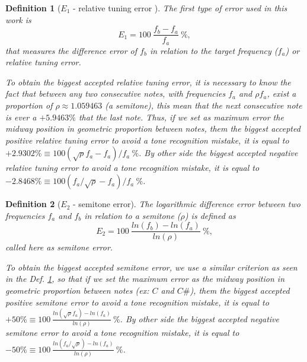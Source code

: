 \documentclass[11pt,twocolumn]{article}
\newtheorem{mydef}{Definition}[section]
\begin{document}
\begin{mydef}[$E_1$ - relative tuning error ]
\label{def:max:E1}
The first type of error used in this work is 
\begin{equation}
E_1=100~\frac{f_b-f_a}{f_a}~\%,
\end{equation} 
that measures the difference error of $f_b$ in relation to the target frequency ($f_a$) or relative tuning error.


To obtain the biggest accepted relative tuning error,
it is necessary to know the fact that between any two consecutive notes, with frequencies
$f_a$ and $\rho f_a$, exist a proportion of $\rho\approx 1.059463$ (a semitone), this mean
that the next consecutive note is ever a $+5.9463\%$ that the last note. Thus, 
if we set as maximum error the midway position in geometric proportion between notes, them 
the biggest accepted positive relative tuning error 
to avoid a tone recognition mistake, it is equal to $+2.9302\% \equiv 100 (\sqrt{\rho}f_a-f_a)/f_a~\%$.
By other side 
the biggest accepted negative relative tuning error 
to avoid a tone recognition mistake, it is equal to $-2.8468\% \equiv 100 (f_a/\sqrt{\rho}-f_a)/f_a~\%$.

\end{mydef}

\begin{mydef}[$E_2$ - semitone error]
\label{def:max:E2}
The logarithmic difference error between two frequencies $f_a$ and $f_b$ in relation to a semitone ($\rho$) is
defined as
\begin{equation}
E_2=100~\frac{ln(f_b)-ln(f_a)}{ln(\rho)}~\%, 
\end{equation}
called here as semitone error.


To obtain the biggest accepted semitone error,
we use a similar criterion as seen in the Def. \ref{def:max:E1},
so that 
if we set the maximum error as the midway position in geometric proportion between notes (ex: $C$ and $C\#$), them 
the biggest accepted positive semitone error 
to avoid a tone recognition mistake, it is equal to $+50\% \equiv 100~\frac{ln(\sqrt{\rho} f_a)-ln(f_a)}{ln(\rho)}~\%  $.
By other side 
the biggest accepted negative semitone error 
to avoid a tone recognition mistake, it is equal to $-50\% \equiv 100~\frac{ln( f_a/\sqrt{\rho})-ln(f_a)}{ln(\rho)}~\%  $.
\end{mydef}
\end{document}
